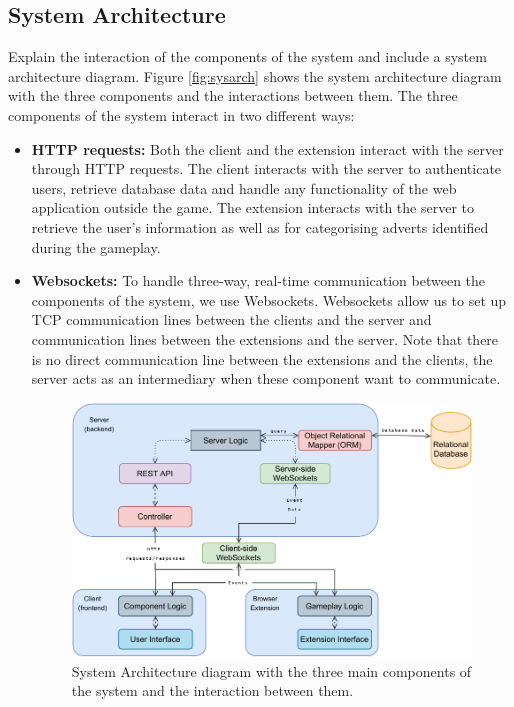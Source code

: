 \documentclass{l4proj}
\begin{document}
\subsection{System Architecture}
Explain the interaction of the components of the system and include a system architecture diagram.
Figure \ref{fig:sysarch} shows the system architecture diagram with the three components and the interactions between them. The three components of the system interact in two different ways:
\begin{itemize}
   \item
   \textbf{HTTP requests:} Both the client and the extension interact with the server through HTTP requests. The client interacts with the server to authenticate users, retrieve database data and handle any functionality of the web application outside the game. The extension interacts with the server to retrieve the user's information as well as for categorising adverts identified during the gameplay.
   \item
   \textbf{Websockets:} To handle three-way, real-time communication between the components of the system, we use Websockets. Websockets allow us to set up TCP communication lines between the clients and the server and communication lines between the extensions and the server. Note that there is no direct communication line between the extensions and the clients, the server acts as an intermediary when these component want to communicate. 

\begin{figure}
    \centering
    \includegraphics[width=1\linewidth]{images/sys_arch.pdf}    

    \caption{System Architecture diagram with the three main components of the system and the interaction between them.}


\end{figure}
\end{itemize}
\end{document}
